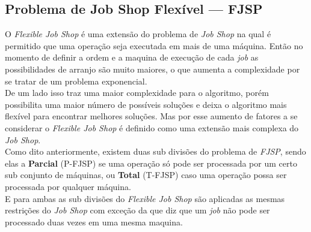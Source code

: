     \subsection{Problema de Job Shop Flexível — FJSP}
            O \textit{Flexible Job Shop} é uma extensão do problema de \textit{Job Shop} na qual é permitido que uma operação seja executada em mais de uma máquina. Então no momento de definir a ordem e a maquina de execução de cada \textit{job} as possibilidades de arranjo são muito maiores, o que aumenta a complexidade por se tratar de um problema exponencial.\\
            \indent De um lado isso traz uma maior complexidade para o algoritmo, porém possibilita uma maior número de possíveis soluções e deixa o algoritmo mais flexível para encontrar melhores soluções. Mas por esse aumento de fatores a se considerar o \textit{Flexible Job Shop} é definido como uma extensão mais complexa do \textit{Job Shop}.\\
            \indent Como dito anteriormente, existem duas sub divisões do problema de \textit{FJSP}, sendo elas a \textbf{Parcial} (P-FJSP) se uma operação só pode ser processada por um certo sub conjunto de máquinas, ou \textbf{Total} (T-FJSP) caso uma operação possa ser processada por qualquer máquina.\\
            \indent E para ambas as sub divisões do \textit{Flexible Job Shop} são aplicadas as mesmas restrições do \textit{Job Shop} com exceção da que diz que um \textit{job} não pode ser processado duas vezes em uma mesma maquina.\hfill

